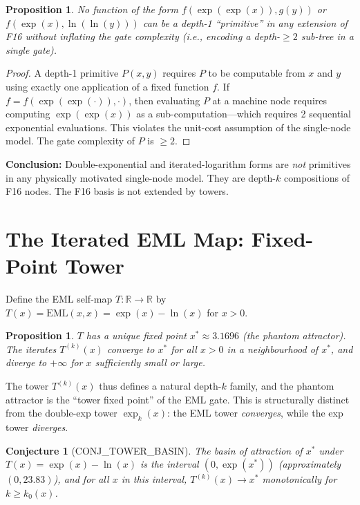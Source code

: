 \documentclass[11pt]{article}
\newtheorem{proposition}[theorem]{Proposition}
\newtheorem{conjecture}[theorem]{Conjecture}
\begin{document}
\begin{proposition}
No function of the form $f(\exp(\exp(x)), g(y))$ or $f(\exp(x), \ln(\ln(y)))$
can be a depth-1 ``primitive'' in any extension of F16 without inflating the
\emph{gate complexity} (i.e., encoding a depth-$\geq 2$ sub-tree in a single gate).
\end{proposition}

\begin{proof}
A depth-1 primitive $P(x,y)$ requires $P$ to be computable from $x$ and $y$
using exactly one application of a fixed function $f$. If $f = f(\exp(\exp(\cdot)), \cdot)$,
then evaluating $P$ at a machine node requires computing $\exp(\exp(x))$ as a
sub-computation---which requires 2 sequential exponential evaluations.
This violates the unit-cost assumption of the single-node model.
The gate complexity of $P$ is $\geq 2$.
\end{proof}

\noindent \textbf{Conclusion:} Double-exponential and iterated-logarithm forms are
\emph{not} primitives in any physically motivated single-node model.
They are depth-$k$ compositions of F16 nodes. The F16 basis is not extended by towers.

\section{The Iterated EML Map: Fixed-Point Tower}
\label{sec:fixedpoint}

Define the EML self-map $T : \mathbb{R} \to \mathbb{R}$ by
$T(x) = \mathrm{EML}(x,x) = \exp(x) - \ln(x)$ for $x > 0$.

\begin{proposition}
$T$ has a unique fixed point $x^* \approx 3.1696$ (the phantom attractor).
The iterates $T^{(k)}(x)$ converge to $x^*$ for all $x > 0$ in a neighbourhood
of $x^*$, and diverge to $+\infty$ for $x$ sufficiently small or large.
\end{proposition}

\noindent The tower $T^{(k)}(x)$ thus defines a natural depth-$k$ family,
and the phantom attractor is the ``tower fixed point'' of the EML gate.
This is structurally distinct from the double-exp tower $\exp_k(x)$:
the EML tower \emph{converges}, while the exp tower \emph{diverges}.

\begin{conjecture}[CONJ\_TOWER\_BASIN]
The basin of attraction of $x^*$ under $T(x) = \exp(x) - \ln(x)$ is
the interval $(0, \exp(x^*))$ (approximately $(0, 23.83)$), and for all
$x$ in this interval, $T^{(k)}(x) \to x^*$ monotonically for $k \geq k_0(x)$.
\end{conjecture}
\end{document}
